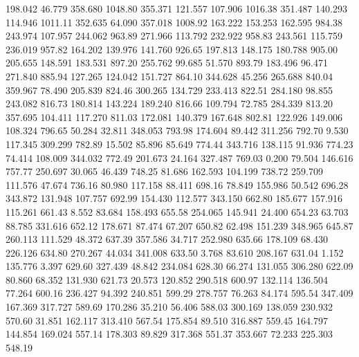  198.042   46.779  358.680      1048.80
 355.371  121.557  107.906      1016.38
 351.487  140.293  114.946      1011.11
 352.635   64.090  357.018      1008.92
 163.222  153.253  162.595       984.38
 243.974  107.957  244.062       963.89
 271.966  113.792  232.922       958.83
 243.561  115.759  236.019       957.82
 164.202  139.976  141.760       926.65
 197.813  148.175  180.788       905.00
 205.655  148.591  183.531       897.20
 255.762   99.685   51.570       893.79
 183.496   96.471  271.840       885.94
 127.265  124.042  151.727       864.10
 344.628   45.256  265.688       840.04
 359.967   78.490  205.839       824.46
 300.265  134.729  233.413       822.51
 284.180   98.855  243.082       816.73
 180.814  143.224  189.240       816.66
 109.794   72.785  284.339       813.20
 357.695  104.411  117.270       811.03
 172.081  140.379  167.648       802.81
 122.926  149.006  108.324       796.65
  50.284   32.811  348.053       793.98
 174.604   89.442  311.256       792.70
   9.530  117.345  309.299       782.89
  15.502   85.896   85.649       774.44
 343.716  138.115   91.936       774.23
  74.414  108.009  344.032       772.49
 201.673   24.164  327.487       769.03
   0.200   79.504  146.616       757.77
 250.697   30.065   46.439       748.25
  81.686  162.593  104.199       738.72
 259.709  111.576   47.674       736.16
  80.980  117.158   88.411       698.16
  78.849  155.986   50.542       696.28
 343.872  131.948  107.757       692.99
 154.430  112.577  343.150       662.80
 185.677  157.916  115.261       661.43
   8.552   83.684  158.493       655.58
 254.065  145.941   24.400       654.23
  63.703   88.785  331.616       652.12
 178.671   87.474   67.207       650.82
  62.498  151.239  348.965       645.87
 260.113  111.529   48.372       637.39
 357.586   34.717  252.980       635.66
 178.109   68.430  226.126       634.80
 270.267   44.034  341.008       633.50
   3.768   83.610  208.167       631.04
   1.152  135.776    3.397       629.60
 327.439   48.842  234.084       628.30
  66.274  131.055  306.280       622.09
  80.860   68.352  131.930       621.73
  20.573  120.852  290.518       600.97
 132.114  136.504   77.264       600.16
 236.427   94.392  240.851       599.29
 278.757   76.263   84.174       595.54
 347.409  167.369  317.727       589.69
 170.286   35.210   56.406       588.03
 300.169  138.059  230.932       570.60
  31.851  162.117  313.410       567.54
 175.854   89.510  316.887       559.45
 164.797  144.854  169.024       557.14
 178.303   89.829  317.368       551.37
 353.667   72.233  225.303       548.19

